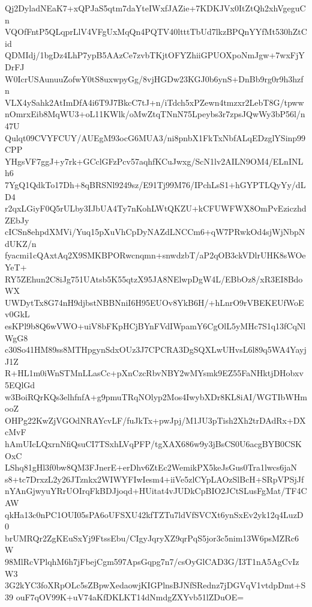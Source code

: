 Qj2DyladNEaK7+xQPJaS5qtm7daYteIWxfJAZie+7KDKJVx0ItZtQh2xhVgeguCn
VQOfFntP5QLqprLlV4VFgUxMqQn4PQTV40ltttTbUd7lkzBPQnYYfMt530hZtCid
QDMIdj/1bgDz4LhP7ypB5AAzCe7zvbTKjtOFYZhiiGPUOXpoNmJgw+7wxFjYDrFJ
W0IcrUSAunuuZofwY0tS8uxwpyGg/8vjHGDw23KGJ0b6ynS+DnBb9rg0r9h3hzfn
VLX4ySahk2AtImDfA4i6T9J7BkcC7tJ+n/iTdch5xPZewn4tmzxr2LebT8G/tpww
nOmrxEib8MqWU3+oL11KWlk/oMwZtqTNnN75Lpeybs3r7zpsJQwWy3bP56l/n47U
Qulqt09CVYFCUY/AUEgM93ocG6MUA3/ni8pnbX1FkTxNbfALqEDzglYSinp99CPP
YHgsVF7ggJ+y7rk+GCclGFzPcv57aqhfKCuJwxg/ScN1lv2AILN9OM4/ELnINLh6
7YgQ1QdkTo17Dh+8qBRSNl9249sz/E91Tj99M76/IPchLsS1+hGYPTLQyYy/dLD4
r2qxLGiyF0Q5rULby3IJbUA4Ty7nKohLWtQKZU+kCFUWFWX8OmPvEziczhdZEbJy
cICSn8ehpdXMVi/Yuq15pXuVhCpDyNAZdLNCCm6+qW7PRwkOd4sjWjNbpNdUKZ/n
fyacmi1cQAxtAq2X9SMKBPORwcnqmn+snwdzbT/aP2qOB3ckVDlrUHK8sWOeYeT+
RY5ZEhun2C8iJg751UAtsb5K55qtzX95JA8NElwpDgW4L/EBbOz8/xR3EI8BdoWX
UWDytTx8G74nH9djbstNBBNniI6H95EUOv8YkB6H/+hLnrO9rVBEKEUfWoEv0GkL
esKPl9b8Q6wVWO+uiV8bFKpHCjBYnFVdIWpamY6CgOlL5yMHc7S1q13fCqNlWgG8
c30So41HM89ss8MTHpgynSdxOUz3J7CPCRA3DgSQXLwUHvsL6l89q5WA4YayjJ1Z
R+HL1m0iWnSTMnLLasCc+pXnCzcRbvNBY2wMYsmk9EZ55FaNHktjDHobxv5EQlGd
w3BoiRQrKQs3elhfnfA+g9pmuTRqNOlyp2Mos4IwybXDr8KL8iAI/WGTIbWHmooZ
OHPg22KwZjVGOdNRAYcvLF/fuJkTx+pwJpj/M1JU3pTish2Xh2trDAdRx+DXcMvF
hAmUIcLQxrnNfiQsuCI7TSxhLVqPFP/tgXAX686w9y3jBsCS0U6acgBYB0CSKOxC
LShq81gHl3f0bw8QM3FJnerE+erDhv6ZtEc2WemikPX5keJsGus0Tra1lwcs6jaN
s8+tc7DrxzL2y26JTznkx2WIWYFIwIesm4+iiVe5zlCYpLAOzSlBcH+SRpVPSjJf
nYAnGjwyuYRrUOIrqFkBDJjoqd+HUitat4vJUDkCpBIO2JCtSLusFgMat/TF4CAW
qkHa13c0nPC1OUI05sPA6oUFSXU42kfTZTu7ldVfSVCXt6ynSxEv2yk12q4LuzD0
brUMRQr2ZgKEuSxYj9FtssEbu/CIgyJqryXZ9qrPqS5jor3c5nim13W6psMZRc6W
98MlRcVPlqhM6h7jFbejCgm597ApsGqpg7n7/csOyGlCAD3G/I3T1nA5AgCvIzW3
3G2kYC3foXRpOLc5sZBpwXedaowjKIGPlnsBJNfSRednz7jDGVqV1vtdpDmt+S39
ouF7qOV99K+uV74aKfDKLKT14dNmdgZXYvb51lZDuOE=
